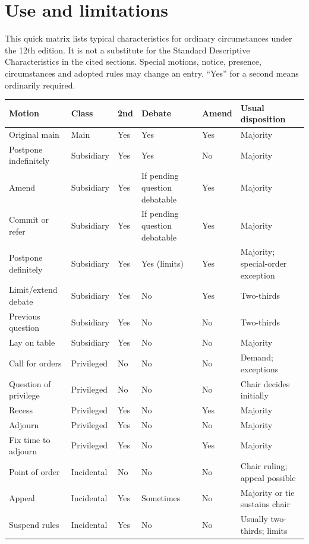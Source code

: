 \documentclass[11pt]{article}
\begin{document}
\SuiteOpen
{}
\section{Use and limitations}
This quick matrix lists typical characteristics for ordinary circumstances under the 12th edition. It is not a substitute for the Standard Descriptive Characteristics in the cited sections. Special motions, notice, presence, circumstances and adopted rules may change an entry. “Yes” for a second means ordinarily required.

\small\begin{longtable}{@{}p{.21\linewidth}p{.13\linewidth}p{.07\linewidth}p{.14\linewidth}p{.08\linewidth}p{.23\linewidth}@{}}\toprule Motion & Class & 2nd & Debate & Amend & Usual disposition \\ \midrule\endhead
Original main & Main & Yes & Yes & Yes & Majority\\
Postpone indefinitely & Subsidiary & Yes & Yes & No & Majority\\
Amend & Subsidiary & Yes & If pending question debatable & Yes & Majority\\
Commit or refer & Subsidiary & Yes & If pending question debatable & Yes & Majority\\
Postpone definitely & Subsidiary & Yes & Yes (limits) & Yes & Majority; special-order exception\\
Limit/extend debate & Subsidiary & Yes & No & Yes & Two-thirds\\
Previous question & Subsidiary & Yes & No & No & Two-thirds\\
Lay on table & Subsidiary & Yes & No & No & Majority\\
Call for orders & Privileged & No & No & No & Demand; exceptions\\
Question of privilege & Privileged & No & No & No & Chair decides initially\\
Recess & Privileged & Yes & No & Yes & Majority\\
Adjourn & Privileged & Yes & No & No & Majority\\
Fix time to adjourn & Privileged & Yes & No & Yes & Majority\\
Point of order & Incidental & No & No & No & Chair ruling; appeal possible\\
Appeal & Incidental & Yes & Sometimes & No & Majority or tie sustains chair\\
Suspend rules & Incidental & Yes & No & No & Usually two-thirds; limits\\

\end{longtable}
\end{document}
